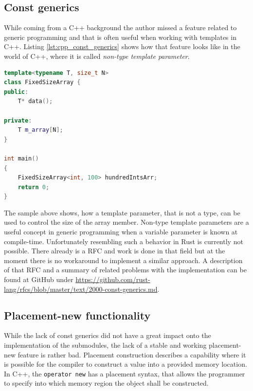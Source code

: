 \subsection{Const generics} \label{rust_const_generics}

While coming from a C++ background the author missed a feature related to generic programming and that is often useful when working with templates in C++. Listing \ref{lst:cpp_const_generics} shows how that feature looks like in the world of C++, where it is called \textit{non-type template parameter}.\\

\begin{lstlisting}[caption={Showcasing non-type template parameters in C++}, label={lst:cpp_const_generics}, language=C++]
template<typename T, size_t N>
class FixedSizeArray {
public:
	T* data();
	
private:
	T m_array[N];
}

int main() 
{
	FixedSizeArray<int, 100> hundredIntsArr;
	return 0;
}
\end{lstlisting}

\noindent
The sample above shows, how a template parameter, that is not a type, can be used to control the size of the array member. Non-type template parameters are a useful concept in generic programming when a variable parameter is known at compile-time. Unfortunately resembling such a behavior in Rust is currently not possible. There already is a \ac{RFC} and work is done in that field but at the moment there is no workaround to implement a similar approach. A description of that \ac{RFC} and a summary of related problems with the implementation can be found at GitHub under \url{https://github.com/rust-lang/rfcs/blob/master/text/2000-const-generics.md}.

\subsection{Placement-new functionality}

While the lack of const generics did not have a great impact onto the implementation of the submodules, the lack of a stable and working placement-new feature is rather bad. Placement construction describes a capability where it is possible for the compiler to construct a value into a provided memory location. In C++, the \texttt{operator new} has a placement syntax, that allows the programmer to specify into which memory region the object shall be constructed.

